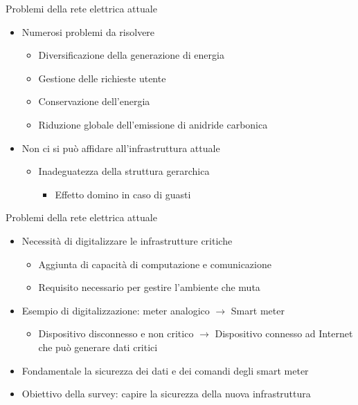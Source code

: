 \begin{frame}{Problemi della rete elettrica attuale}
	\begin{itemize}[<+- | alert@+>]
	\item Numerosi problemi da risolvere
		\begin{itemize}
		\item Diversificazione della generazione di energia
		\item Gestione delle richieste utente
		\item Conservazione dell’energia
		\item Riduzione globale dell’emissione di anidride carbonica
		\end{itemize}
	\item Non ci si può affidare all'infrastruttura attuale
		\begin{itemize}
			\item Inadeguatezza della struttura gerarchica
			 	\begin{itemize}
			 	\item Effetto domino in caso di guasti
			 	\end{itemize}
		\end{itemize}
	\end{itemize}
\end{frame}

\begin{frame}{Problemi della rete elettrica attuale}
	\begin{itemize}[<+- | alert@+>]
	\item Necessità di digitalizzare le infrastrutture critiche
		\begin{itemize}
		\item Aggiunta di capacità di computazione e comunicazione
		\item Requisito necessario per gestire l'ambiente che muta
		\end{itemize}
	\item Esempio di digitalizzazione: meter analogico $\rightarrow$ Smart meter
		\begin{itemize}
			\item Dispositivo disconnesso e non critico $\rightarrow$ Dispositivo connesso ad Internet che può generare dati critici
		\end{itemize}
\item Fondamentale la sicurezza dei dati e dei comandi degli smart meter
\item Obiettivo della survey: capire la sicurezza della nuova infrastruttura
	\end{itemize}
\end{frame}

